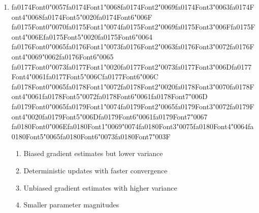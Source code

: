 \documentclass[12pt]{article}
\begin{document}
\begin{enumerate}[label=Q\arabic*.]
 \item {\csname fa0174Font0\endcsname\char"0057}{\csname fa0174Font1\endcsname\char"0068}{\csname fa0174Font2\endcsname\char"0069}{\csname fa0174Font3\endcsname\char"0063}{\csname fa0174Font4\endcsname\char"0068}{\csname fa0174Font5\endcsname\char"0020}{\csname fa0174Font6\endcsname\char"006F} {\csname fa0175Font0\endcsname\char"0070}{\csname fa0175Font1\endcsname\char"0074}{\csname fa0175Font2\endcsname\char"0069}{\csname fa0175Font3\endcsname\char"006F}{\csname fa0175Font4\endcsname\char"006E}{\csname fa0175Font5\endcsname\char"0020}{\csname fa0175Font6\endcsname\char"0064} {\csname fa0176Font0\endcsname\char"0065}{\csname fa0176Font1\endcsname\char"0073}{\csname fa0176Font2\endcsname\char"0063}{\csname fa0176Font3\endcsname\char"0072}{\csname fa0176Font4\endcsname\char"0069}{\char"0062}{\csname fa0176Font6\endcsname\char"0065} {\csname fa0177Font0\endcsname\char"0073}{\csname fa0177Font1\endcsname\char"0020}{\csname fa0177Font2\endcsname\char"0073}{\csname fa0177Font3\endcsname\char"006D}{\csname fa0177Font4\endcsname\char"0061}{\csname fa0177Font5\endcsname\char"006C}{\csname fa0177Font6\endcsname\char"006C} {\csname fa0178Font0\endcsname\char"0065}{\csname fa0178Font1\endcsname\char"0072}{\csname fa0178Font2\endcsname\char"0020}{\csname fa0178Font3\endcsname\char"0070}{\csname fa0178Font4\endcsname\char"0061}{\csname fa0178Font5\endcsname\char"0072}{\csname fa0178Font6\endcsname\char"0061}{\csname fa0178Font7\endcsname\char"006D} {\csname fa0179Font0\endcsname\char"0065}{\csname fa0179Font1\endcsname\char"0074}{\csname fa0179Font2\endcsname\char"0065}{\csname fa0179Font3\endcsname\char"0072}{\csname fa0179Font4\endcsname\char"0020}{\csname fa0179Font5\endcsname\char"006D}{\csname fa0179Font6\endcsname\char"0061}{\csname fa0179Font7\endcsname\char"0067} {\csname fa0180Font0\endcsname\char"006E}{\csname fa0180Font1\endcsname\char"0069}{\char"0074}{\csname fa0180Font3\endcsname\char"0075}{\csname fa0180Font4\endcsname\char"0064}{\csname fa0180Font5\endcsname\char"0065}{\csname fa0180Font6\endcsname\char"0073}{\csname fa0180Font7\endcsname\char"003F}
 \begin{enumerate}[label=(\Alph*)]
     \item Biased gradient estimates but lower variance
     \item Deterministic updates with faster convergence
     \item Unbiased gradient estimates with higher variance
     \item Smaller parameter magnitudes
 \end{enumerate}
 

\end{enumerate}
\end{document}
